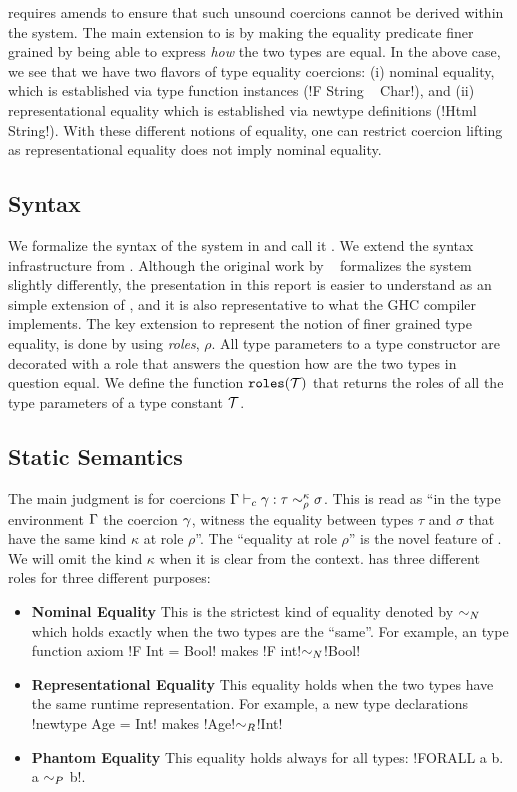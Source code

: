 \documentclass[screen,nonacm,manuscript,review]{acmart} %
\begin{document}
\SFC requires amends to ensure that such unsound coercions cannot be derived within the system.
The main extension to \SFC is by making the equality predicate finer grained by being able to express \emph{how} the two types are equal. In the above case, we see that we have two flavors of type equality coercions: (i) nominal equality, which is established via type function instances (!F String ~ Char!), and (ii) representational equality which is established via newtype definitions (!Html ~ String!). With these different notions of equality, one can restrict coercion lifting as representational equality does not imply nominal equality.

\subsection{Syntax}\label{sec:sfr-syntax}
We formalize the syntax of the system in  and call it \SFR. We extend the syntax infrastructure from . Although the original work by ~\citet{breitner_safe_2014, weirich_generative_2011} formalizes the system slightly differently, the presentation in this report is easier to understand as an simple extension of \SFC, and it is also representative to what the GHC compiler implements.  The key extension to represent the notion of finer grained type equality, is done by using \emph{roles}, $\rho$. All type parameters to a type constructor are decorated with a role that answers the question how are the two types in question equal. We define the function $\texttt{roles}(\mathcal{T})$ that returns the roles of all the type parameters of a type constant $\mathcal{T}$.

\subsection{Static Semantics}\label{sec:sfr-static-sem}
The main judgment is for coercions $\Gamma \vdash_{c} \gamma : \tau\sim^\kappa_\rho\sigma$. This is read as ``in the type environment $\Gamma$ the coercion $\gamma$, witness the equality between types $\tau$ and $\sigma$ that have the same kind $\kappa$ at role $\rho$''. The ``equality at role $\rho$'' is the novel feature of \SFR. We will omit the kind $\kappa$ when it is clear from the context. \SFR has three different roles for three different purposes:
\begin{itemize}
\item\textbf{Nominal Equality} This is the strictest kind of equality denoted by $\mathrel{\sim_N}$ which holds exactly when the two types are the ``same''. For example, an type function axiom !F Int = Bool! makes !F int!$\mathrel{\sim_N}$!Bool!
\item\textbf{Representational Equality} This equality holds when the two types have the same runtime representation. For example, a new type declarations !newtype Age = Int! makes !Age!$\mathrel{\sim_R}$!Int!
\item\textbf{Phantom Equality} This equality holds always for all types: !FORALL a b. a $\mathrel{\sim_P}$ b!.
\end{itemize}
\end{document}

